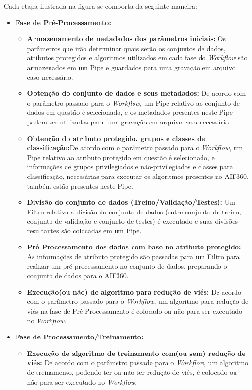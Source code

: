\documentclass[portugues]{ic-tese}
\begin{document}
Cada etapa ilustrada na figura se comporta da seguinte maneira:

\begin{itemize}
\item \textbf{Fase de Pré-Processamento:}
	\begin{itemize}
	\item \textbf{Armazenamento de metadados dos parâmetros iniciais:} Os parâmetros que irão determinar quais serão os conjuntos de dados, atributos protegidos e algoritmos utilizados em cada fase do \textit{Workflow} são armazenados em um Pipe e guardados para uma gravação em arquivo caso necessário.
	\item \textbf{Obtenção do conjunto de dados e seus metadados:} De acordo com o parâmetro passado para o \textit{Workflow}, um Pipe relativo ao conjunto de dados em questão é selecionado, e os metadados presentes neste Pipe podem ser utilizados para uma gravação em arquivo caso necessário.
	\item \textbf{Obtenção do atributo protegido, grupos e classes de classificação:}De acordo com o parâmetro passado para o \textit{Workflow}, um Pipe relativo ao atributo protegido em questão é selecionado, e informações de grupos privilegiados e não-privilegiados e classes para classificação, necessárias para executar os algoritmos presentes no AIF360, também estão presentes neste Pipe.
	\item \textbf{Divisão do conjunto de dados (Treino/Validação/Testes):} Um Filtro relativo a divisão do conjunto de dados (entre conjunto de treino, conjunto de validação e conjunto de testes) é executado e suas divisões resultantes são colocadas em um Pipe.
	\item \textbf{Pré-Processamento dos dados com base no atributo protegido:} As informações de atributo protegido são passadas para um Filtro para realizar um pré-processamento no conjunto de dados, preparando o conjunto de dados para o AIF360.
	\item \textbf{Execução(ou não) de algoritmo para redução de viés:} De acordo com o parâmetro passado para o \textit{Workflow}, um algoritmo para redução de viés na fase de Pré-Processamento é colocado ou não para ser executado no \textit{Workflow}. 
	\end{itemize}
\item \textbf{Fase de Processamento/Treinamento:}
	\begin{itemize}
	\item \textbf{Execução de algoritmo de treinamento com(ou sem) redução de viés:} De acordo com o parâmetro passado para o \textit{Workflow}, um algoritmo de treinamento, podendo ter ou não ter redução de viés, é colocado ou não para ser executado no \textit{Workflow}.

\end{itemize}
\end{itemize}
\end{document}
